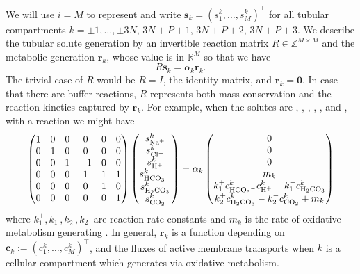 \documentclass{article}
\begin{document}
We will use $i=M$ to represent  and write $\mathbf{s}_k = (s_1^k,\dots,s_M^k)^\top$ for all tubular compartments $k=\pm 1,\dots,\pm 3N,\, 3N+P+1,\, 3N+P+2,\, 3N+P+3$.
We describe the tubular solute generation by an invertible reaction matrix $R\in \mathbb{Z}^{M\times M}$ and the metabolic generation $\mathbf{r}_k$, whose value is in $\mathbb{R}^M$ so that we have
\begin{equation}\label{eq:gen}
    R \mathbf{s}_k = \alpha_k\mathbf{r}_k.
\end{equation}
The trivial case of $R$ would be $R=I$, the identity matrix, and $\mathbf{r}_k=\mathbf{0}$.
In case that there are buffer reactions, $R$ represents both mass conservation and the reaction kinetics captured by $\mathbf{r}_k$.
For example, when the solutes are , , , , , and , with a reaction  we might have
\begin{equation*}
    \begin{pmatrix}
        1 & 0 & 0 & 0 & 0 & 0\\
        0 & 1 & 0 & 0 & 0 & 0\\
        0 & 0 & 1 & -1& 0 & 0\\
        0 & 0 & 0 & 1 & 1 & 1\\
        0 & 0 & 0 & 0 & 1 & 0\\
        0 & 0 & 0 & 0 & 0 & 1\\
    \end{pmatrix}
    \begin{pmatrix}
        s_{\ce{Na+}}^k \\  s_{\ce{Cl-}}^k \\ s_{\ce{H+}}^k \\ s_{\ce{HCO3-}}^k \\ s_{\ce{H2CO3}}^k \\ s_{\ce{CO2}}^k
    \end{pmatrix}
    = \alpha_k\begin{pmatrix}
        0 \\ 0 \\ 0 \\ m_k \\ k_1^+c_{\ce{HCO3-}}^kc_{\ce{H+}}^k-k_1^-c_{\ce{H2CO3}}^k\\
        k_2^+c_{\ce{H2CO3}}^k - k_2^-c_{\ce{CO2}}^k+m_k
    \end{pmatrix}
\end{equation*}
    where $k_1^+,k_1^-,k_2^+,k_2^-$ are reaction rate constants and $m_k$ is the rate of oxidative metabolism generating .
In general, $\mathbf{r}_k$ is a function depending on $\mathbf{c}_k:=(c_1^k,\dots,c_M^k)^\top$, and the fluxes of active membrane transports when $k$ is a cellular compartment which generates  via oxidative metabolism.
\end{document}
